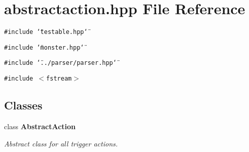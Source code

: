 \section{abstractaction.hpp File Reference}
\label{abstractaction_8hpp}
{\tt \#include \char`\"{}testable.hpp\char`\"{}}\par
{\tt \#include \char`\"{}monster.hpp\char`\"{}}\par
{\tt \#include \char`\"{}../parser/parser.hpp\char`\"{}}\par
{\tt \#include $<$fstream$>$}\par
\subsection*{Classes}
\begin{CompactItemize}
\item 
class {\bf Abstract\-Action}
\begin{CompactList}\small\item\em Abstract class for all trigger actions. \item\end{CompactList}\end{CompactItemize}
